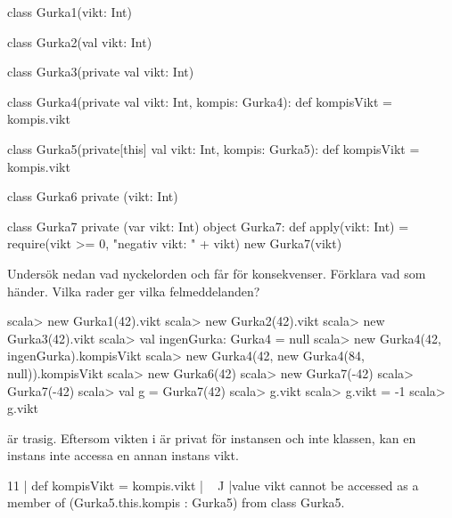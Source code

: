 \begin{Code}
class Gurka1(vikt: Int)

class Gurka2(val vikt: Int)

class Gurka3(private val vikt: Int)

class Gurka4(private val vikt: Int, kompis: Gurka4):
  def kompisVikt = kompis.vikt

class Gurka5(private[this] val vikt: Int, kompis: Gurka5):
  def kompisVikt = kompis.vikt

class Gurka6 private (vikt: Int)

class Gurka7 private (var vikt: Int)
object Gurka7:
  def apply(vikt: Int) =
    require(vikt >= 0, "negativ vikt: " + vikt)
    new Gurka7(vikt)
\end{Code}

\Subtask Undersök nedan vad nyckelorden  och  får för konsekvenser. Förklara vad som händer. Vilka rader ger vilka felmeddelanden?

\begin{REPL}
scala> new Gurka1(42).vikt
scala> new Gurka2(42).vikt
scala> new Gurka3(42).vikt
scala> val ingenGurka: Gurka4 = null
scala> new Gurka4(42, ingenGurka).kompisVikt
scala> new Gurka4(42, new Gurka4(84, null)).kompisVikt
scala> new Gurka6(42)
scala> new Gurka7(-42)
scala> Gurka7(-42)
scala> val g = Gurka7(42)
scala> g.vikt
scala> g.vikt = -1
scala> g.vikt
\end{REPL}


\SOLUTION


\TaskSolved \what

\SubtaskSolved {} är trasig. Eftersom vikten i  är privat för instansen och inte klassen, kan en instans inte accessa en annan instans vikt.
\begin{REPL}
11 |  def kompisVikt = kompis.vikt
   |                   ^^^^^^^^^^^
   |value vikt cannot be accessed as a member of (Gurka5.this.kompis : Gurka5) from class Gurka5.
\end{REPL}


